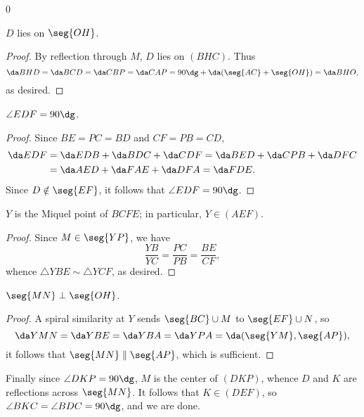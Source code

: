 \setcounter{iclaim}0
\begin{iclaim}
    $D$ lies on $\seg{OH}$.
\end{iclaim}
\begin{proof}
    By reflection through $M$, $D$ lies on $(BHC)$. Thus \[\da BHD=\da BCD=\da CBP=\da CAP=90\dg+\da(\seg{AC}+\seg{OH})=\da BHO,\]
    as desired.
\end{proof}
\begin{iclaim}
    $\angle EDF=90\dg$.
\end{iclaim}
\begin{proof}
    Since $BE=PC=BD$ and $CF=PB=CD$,
    \begin{align*}
        \da EDF&=\da EDB+\da BDC+\da CDF=\da BED+\da CPB+\da DFC\\
        &=\da AED+\da FAE+\da DFA=\da FDE.
    \end{align*}
    Since $D\notin\seg{EF}$, it follows that $\angle EDF=90\dg$.
\end{proof}
\begin{iclaim}
    $Y$ is the Miquel point of $BCFE$; in particular, $Y\in(AEF)$.
\end{iclaim}
\begin{proof}
    Since $M\in\seg{YP}$, we have \[\frac{YB}{YC}=\frac{PC}{PB}=\frac{BE}{CF},\]
    whence $\triangle YBE\sim\triangle YCF$, as desired.
\end{proof}
\begin{iclaim}
    $\seg{MN}\perp\seg{OH}$.
\end{iclaim}
\begin{proof}
    A spiral similarity at $Y$ sends $\seg{BC}\cup M$ to $\seg{EF}\cup N$, so \[\da YMN=\da YBE=\da YBA=\da YPA=\da(\seg{YM},\seg{AP}),\]
    it follows that $\seg{MN}\parallel\seg{AP}$, which is sufficient.
\end{proof}

Finally since $\angle DKP=90\dg$, $M$ is the center of $(DKP)$, whence $D$ and $K$ are reflections across $\seg{MN}$. It follows that $K\in(DEF)$, so $\angle BKC=\angle BDC=90\dg$, and we are done.

